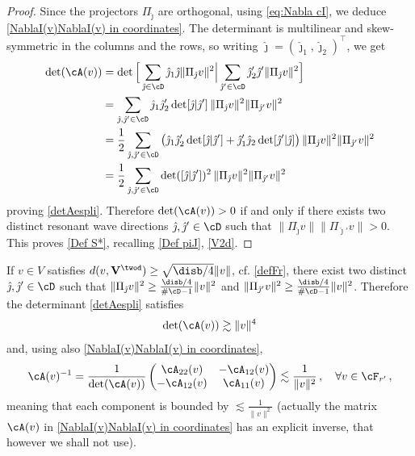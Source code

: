 \documentclass[11pt,a4paper,reqno]{article}
\numberwithin{equation}{section}
\theoremstyle{definition}
\begin{document}
 \begin{proof}
    Since the projectors $\Pi_{\hat \jmath}$ are orthogonal, using \eqref{eq:Nabla cI}, we deduce \eqref{NablaI(v)NablaI(v) in coordinates}.
    The determinant is multilinear and skew-symmetric in the columns and the rows, so writing
    $ \hat\jmath 
    = (\hat\jmath_1, 
    \hat \jmath_2)^\top  $, we get
        $$
            \begin{aligned}
                \det(\cA(v))&=\det\Big[\sum_{\hat \jmath\in \cD} \hat \jmath_1 \hat \jmath\|\Pi_{\hat \jmath} v\|^2\Big| \sum_{\hat \jmath'\in \cD} \hat \jmath_2' \hat \jmath'\|\Pi_{\hat \jmath} v\|^2\Big]\\
                &=\sum_{\hat \jmath,\hat \jmath'\in \cD} \hat \jmath_1\hat \jmath_2'\det[\hat \jmath|\hat \jmath']\, \|\Pi_{\hat \jmath} v\|^2 \|\Pi_{\hat \jmath'} v\|^2\\
                &=\frac12 \sum_{\hat \jmath,\hat \jmath'\in \cD} \big(\hat \jmath_1\hat \jmath_2'\det[\hat \jmath|\hat \jmath']+\hat \jmath_1'\hat \jmath_2\det[\hat \jmath'|\hat \jmath]\big)\, \|\Pi_{\hat \jmath} v\|^2 \|\Pi_{\hat \jmath'} v\|^2\\
                &=\frac12\sum_{\hat \jmath,\hat \jmath'\in \cD} \det([\hat \jmath|\hat \jmath'])^2\, \|\Pi_{\hat \jmath} v\|^2 \|\Pi_{\hat \jmath'} v\|^2 
            \end{aligned}
        $$
        proving \eqref{detAespli}. 
        Therefore $\det(\cA(v))>0$ if and only if there exists two distinct resonant wave directions $\hat \jmath,\hat \jmath'\in \cD$ such that $\|\Pi_{\hat \jmath} v\|\|\Pi_{\hat \jmath'}v\|>0$. This proves 
         \eqref{Def S*},   recalling \eqref{Def piJ}, \eqref{V2d}.
    \end{proof}
    If  $v\in V$ satisfies $d(v,{\bf V}^{\twod})\geq \sqrt{\disb/4}\|v\|$, cf. \eqref{defFr},
    there exist two distinct $\hat \jmath,\hat \jmath'\in \cD$ such that
    $
        \|\Pi_{\hat \jmath}v\|^2\geq  \tfrac{\disb/4}{\#\cD-1}\|v\|^2 $ and $ \|\Pi_{\hat \jmath'}v\|^2\geq  \tfrac{\disb/4}{\#\cD-1}\|v\|^2 $. Therefore  the determinant 
        \eqref{detAespli}
        satisfies  
\begin{equation}\label{lem:c away from S* estimate 30}
\det(\cA(v))\gtrsim \|v\|^4
\end{equation}
and, using also \eqref{NablaI(v)NablaI(v) in coordinates}, 
    \begin{equation}\label{lem:c away from S* estimate 3}
     \cA(v)^{-1}=\frac{1}{\det(\cA(v))}
        \left(\begin{matrix}
           \cA_{22}(v) &-\cA_{12}(v) \\
           -\cA_{12}(v) &\cA_{11}(v) 
        \end{matrix}\right)\lesssim \frac{1}{\|v\|^2} \, , 
        \quad \forall 
        v \in \cF_{r'} \, , 
    \end{equation}
    meaning that each component is bounded by $\lesssim \tfrac{1}{\|v\|^2}$ (actually the matrix $ \cA(v) $ in   
    \eqref{NablaI(v)NablaI(v) in coordinates} has 
    an explicit inverse,   
    that however we shall not use).
\end{document}
